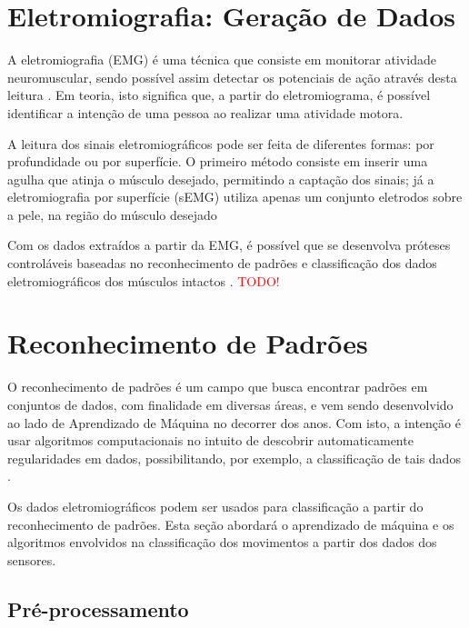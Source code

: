 \section{Eletromiografia: Geração de Dados}
\label{sec:emg}
A eletromiografia (EMG) é uma técnica que consiste em monitorar atividade neuromuscular, sendo possível assim detectar os potenciais de ação através desta leitura \cite{deluca:1979}. Em teoria, isto significa que, a partir do eletromiograma, é possível identificar a intenção de uma pessoa ao realizar uma atividade motora.

A leitura dos sinais eletromiográficos pode ser feita de diferentes formas: por profundidade ou por superfície. O primeiro método consiste em inserir uma agulha que atinja o músculo desejado, permitindo a captação dos sinais; já a eletromiografia por superfície (sEMG) utiliza apenas um conjunto eletrodos sobre a pele, na região do músculo desejado \cite{deluca:1979}

Com os dados extraídos a partir da EMG, é possível que se desenvolva próteses controláveis baseadas no reconhecimento de padrões e classificação dos dados eletromiográficos dos músculos intactos \cite{park:1998}.
\textcolor{red}{TODO!}



\section{Reconhecimento de Padrões}
\label{sec:patternrec}
O reconhecimento de padrões é um campo que busca encontrar padrões em conjuntos de dados, com finalidade em diversas áreas, e vem sendo desenvolvido ao lado de Aprendizado de Máquina no decorrer dos anos. Com isto, a intenção é usar algoritmos computacionais no intuito de descobrir automaticamente regularidades em dados, possibilitando, por exemplo, a classificação de tais dados \cite{bishop:2006}.

Os dados eletromiográficos podem ser usados para classificação a partir do reconhecimento de padrões. Esta seção abordará o aprendizado de máquina e os algoritmos envolvidos na classificação dos movimentos a partir dos dados dos sensores.
\subsection{Pré-processamento}

